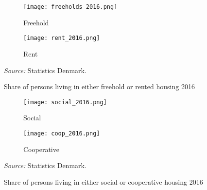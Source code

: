 \begin{figure}
\centering
\begin{minipage}{0.85\textwidth}
\begin{subfigure}{.50\textwidth}
  \centering
  \texttt{[image: freeholds\_2016.png]}
  \caption{\footnotesize{Freehold}}
  \label{fig:freehold}
\end{subfigure}%
\begin{subfigure}{.50\textwidth}
  \centering
  \texttt{[image: rent\_2016.png]}
  \caption{\footnotesize{Rent}}
  \label{fig:rent}
\end{subfigure}
{\tiny \emph{Source:} Statistics Denmark.\par}
\end{minipage}
\caption{Share of persons living in either freehold or rented housing 2016}
\label{fig:freerent}
\end{figure}


\begin{figure}
\centering
\begin{minipage}{0.85\textwidth}
\begin{subfigure}{.50\textwidth}
  \centering
  \texttt{[image: social\_2016.png]}
  \caption{\footnotesize{Social}}
  \label{fig:social}
\end{subfigure}%
\begin{subfigure}{.50\textwidth}
  \centering
  \texttt{[image: coop\_2016.png]}
  \caption{\footnotesize{Cooperative}}
  \label{fig:coop}
\end{subfigure}
{\tiny \emph{Source:} Statistics Denmark.\par}
\end{minipage}
\caption{Share of persons living in either social or cooperative housing 2016}
\label{fig:socialcoop}
\end{figure}

